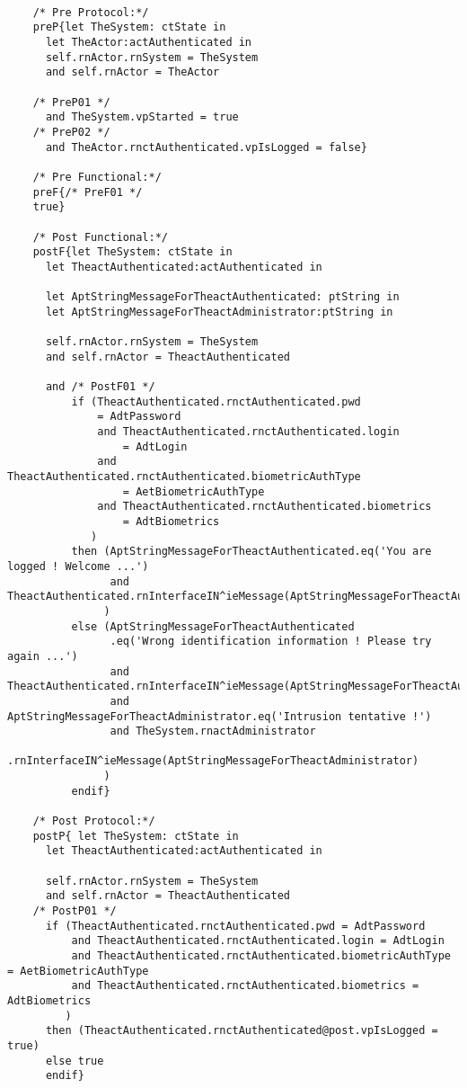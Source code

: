 	\scriptsize
	\vspace{0.5cm}
	\begin{lstlisting}[style=MessirStyle,firstnumber=auto,captionpos=b,caption={\msrmessir (MCL-oriented) specification of the operation \emph{oeLogin}.},label=OM-actAuthenticated-oeLogin-MCL-LST]

	/* Pre Protocol:*/ 
	preP{let TheSystem: ctState in
	  let TheActor:actAuthenticated in
	  self.rnActor.rnSystem = TheSystem
	  and self.rnActor = TheActor
	  
	/* PreP01 */
	  and TheSystem.vpStarted = true
	/* PreP02 */
	  and TheActor.rnctAuthenticated.vpIsLogged = false}
	
	/* Pre Functional:*/
	preF{/* PreF01 */
	true}
	
	/* Post Functional:*/ 
	postF{let TheSystem: ctState in
	  let TheactAuthenticated:actAuthenticated in
	
	  let AptStringMessageForTheactAuthenticated: ptString in
	  let AptStringMessageForTheactAdministrator:ptString in
	  
	  self.rnActor.rnSystem = TheSystem
	  and self.rnActor = TheactAuthenticated
	  
	  and /* PostF01 */
	      if (TheactAuthenticated.rnctAuthenticated.pwd
	          = AdtPassword
	          and TheactAuthenticated.rnctAuthenticated.login
	              = AdtLogin
	          and TheactAuthenticated.rnctAuthenticated.biometricAuthType
	              = AetBiometricAuthType
	          and TheactAuthenticated.rnctAuthenticated.biometrics
	              = AdtBiometrics
	         )
	      then (AptStringMessageForTheactAuthenticated.eq('You are logged ! Welcome ...')
	            and TheactAuthenticated.rnInterfaceIN^ieMessage(AptStringMessageForTheactAuthenticated)
	           )
	      else (AptStringMessageForTheactAuthenticated
	            .eq('Wrong identification information ! Please try again ...')
	            and TheactAuthenticated.rnInterfaceIN^ieMessage(AptStringMessageForTheactAuthenticated)
	            and AptStringMessageForTheactAdministrator.eq('Intrusion tentative !')
	            and TheSystem.rnactAdministrator
	                .rnInterfaceIN^ieMessage(AptStringMessageForTheactAdministrator)
	           )
	      endif}
	
	/* Post Protocol:*/ 
	postP{ let TheSystem: ctState in
	  let TheactAuthenticated:actAuthenticated in
	
	  self.rnActor.rnSystem = TheSystem
	  and self.rnActor = TheactAuthenticated
	/* PostP01 */
	  if (TheactAuthenticated.rnctAuthenticated.pwd = AdtPassword
	      and TheactAuthenticated.rnctAuthenticated.login = AdtLogin
	      and TheactAuthenticated.rnctAuthenticated.biometricAuthType = AetBiometricAuthType
	      and TheactAuthenticated.rnctAuthenticated.biometrics = AdtBiometrics
	     )
	  then (TheactAuthenticated.rnctAuthenticated@post.vpIsLogged = true)
	  else true
	  endif}
	
	\end{lstlisting}
	\normalsize 
	
	
	
	





